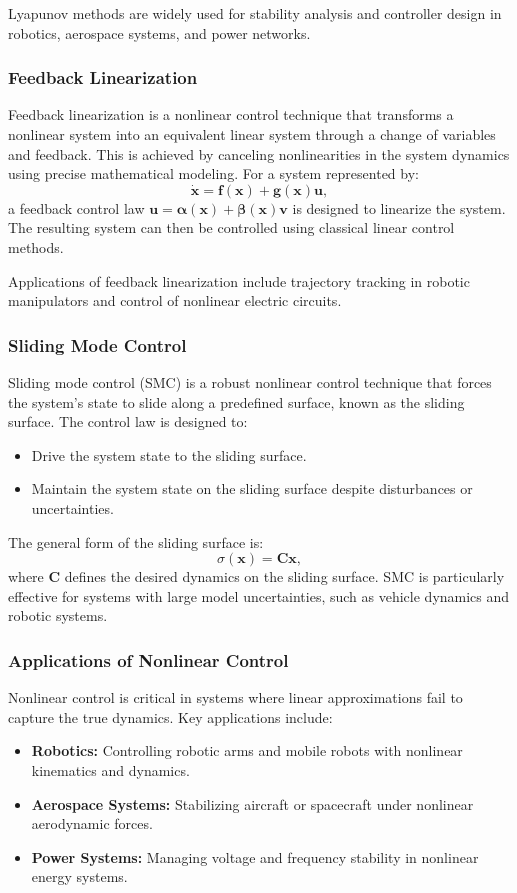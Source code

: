 \documentclass{IEEEojcsys}
\begin{document}
Lyapunov methods are widely used for stability analysis and controller design in robotics, aerospace systems, and power networks.

\subsubsection{Feedback Linearization}
Feedback linearization is a nonlinear control technique that transforms a nonlinear system into an equivalent linear system through a change of variables and feedback. This is achieved by canceling nonlinearities in the system dynamics using precise mathematical modeling. For a system represented by:
\[
\dot{\mathbf{x}} = \mathbf{f}(\mathbf{x}) + \mathbf{g}(\mathbf{x})\mathbf{u},
\]
a feedback control law $\mathbf{u} = \mathbf{\alpha}(\mathbf{x}) + \mathbf{\beta}(\mathbf{x})\mathbf{v}$ is designed to linearize the system. The resulting system can then be controlled using classical linear control methods.

Applications of feedback linearization include trajectory tracking in robotic manipulators and control of nonlinear electric circuits.

\subsubsection{Sliding Mode Control}
Sliding mode control (SMC) is a robust nonlinear control technique that forces the system's state to slide along a predefined surface, known as the sliding surface. The control law is designed to:
\begin{itemize}
    \item Drive the system state to the sliding surface.
    \item Maintain the system state on the sliding surface despite disturbances or uncertainties.
\end{itemize}
The general form of the sliding surface is:
\[
\sigma(\mathbf{x}) = \mathbf{C}\mathbf{x},
\]
where $\mathbf{C}$ defines the desired dynamics on the sliding surface. SMC is particularly effective for systems with large model uncertainties, such as vehicle dynamics and robotic systems.

\subsubsection{Applications of Nonlinear Control}
Nonlinear control is critical in systems where linear approximations fail to capture the true dynamics. Key applications include:
\begin{itemize}
    \item \textbf{Robotics:} Controlling robotic arms and mobile robots with nonlinear kinematics and dynamics.
    \item \textbf{Aerospace Systems:} Stabilizing aircraft or spacecraft under nonlinear aerodynamic forces.
    \item \textbf{Power Systems:} Managing voltage and frequency stability in nonlinear energy systems.
\end{itemize}
\end{document}
